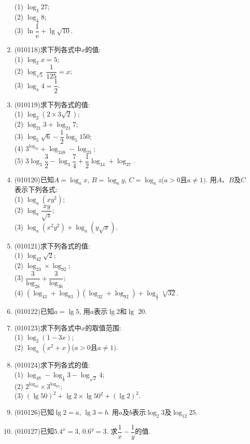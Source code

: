 \documentclass[10pt,a4paper]{article}
\begin{document}
\begin{enumerate}[1.]
(1) $\log_3 27$;\\
(2) $\log_{\frac 12}8$;\\
(3) $\ln \dfrac 1{\mathrm{e}}+\lg \sqrt {10}$.
\item {\tiny (010118)}求下列各式中$x$的值:\\
(1) $\log_2x=5$;\\
(2) $\log_{\sqrt 5}\dfrac1{125}=x$;\\
(3) $\log_x4=\dfrac 12$.
\item {\tiny (010119)}求下列各式的值:\\
(1) $\log_2(2\times 3\sqrt 2)$;\\
(2) $\log_{21}3+\log_{21}7$;\\
(3) $\log_5\sqrt 6-\dfrac 12\log_5 150$;\\
(4) $3^{\log_31}+\log_248-\log_23$;\\
(5) $3\log_3\dfrac 32-\log_3\dfrac 74+\dfrac 12\log_34+\log_37$.
\item {\tiny (010120)}已知$A=\log_ax$, $B=\log_ay$, $C=\log_az$($a>0$且$a\ne 1)$. 用$A$、$B$及$C$表示下列各式:\\
(1) $\log_a(xy^2)$;\\
(2) $\log_a\dfrac{xy}{\sqrt z}$;\\
(3) $\log_a(x^2y^2)+\log_a(y\sqrt x)$.
\item {\tiny (010121)}求下列各式的值:\\
(1) $\log_42\sqrt 2$;\\
(2) $\log_23\times \log_92$;\\
(3) $\dfrac 3{\log_26}+\dfrac 3{\log_36}$;\\
(4) $(\log_43+\log_83)(\log_32+\log_92)+\log_{\frac 12}\sqrt[4]{32}$.
\item {\tiny (010122)}已知$a=\lg 5$, 用$a$表示$\lg 2$和$\lg$ $20$.
\item {\tiny (010123)}求下列各式中$x$的取值范围:\\
(1) $\log_2(1-3x)$;\\
(2) $\log_a(x^2+x)$($a>0$且$a\ne 1)$.
\item {\tiny (010124)}求下列各式的值:\\
(1) $\log_48-\log_{\frac 19}3-\log_{\sqrt 2}4$;\\
(2) $2^{\log_65}\times 3^{\log_65}$;\\
(3) $(\lg 50)^2+\lg 2\times \lg 50^2+(\lg 2)^2$.
\item {\tiny (010126)}已知$\lg 2=a$, $\lg 3=b$. 用$a$及$b$表示$\log_2 3$及$\log_{12}25$.
\item {\tiny (010127)}已知$5.4^x=3$, $0.6^y=3$. 求$\dfrac 1x-\dfrac 1y$的值.

\end{enumerate}
\end{document}
